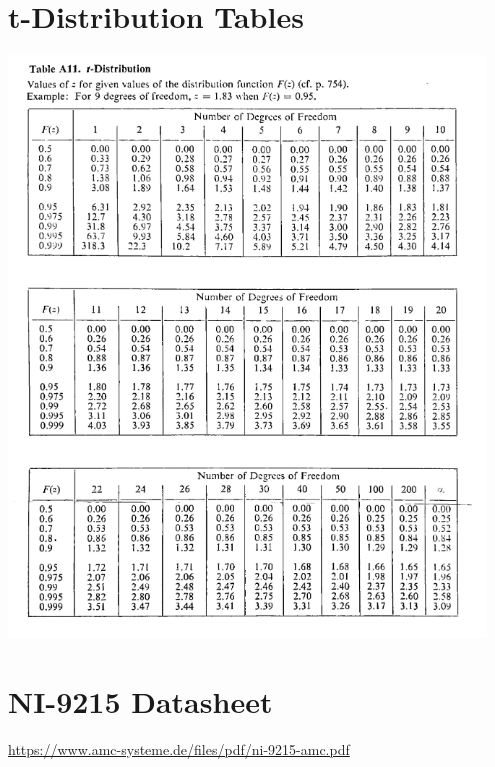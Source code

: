\documentclass{article}
\begin{document}
\newpage
\begin{appendices}
\pagestyle{fancy}
\renewcommand{\thefigure}{A\arabic{figure}}
\setcounter{figure}{0}

\section*{t-Distribution Tables}
\hypertarget{1}{\includegraphics[width=0.95\textwidth]{t_distribution_Table_lecture3.png}}

\section*{NI-9215 Datasheet}
\url{https://www.amc-systeme.de/files/pdf/ni-9215-amc.pdf}

\end{appendices}
\end{document}
